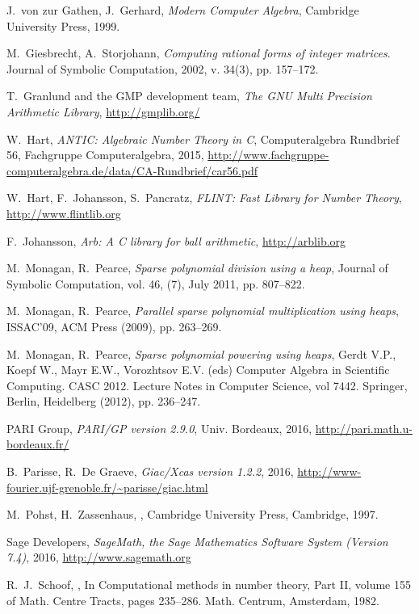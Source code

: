 \documentclass{sig-alternate-05-2015}
\begin{document}
{\begin{thebibliographyy}{99}
J.~von zur Gathen, J.~Gerhard, {\em Modern Computer Algebra}, Cambridge University Press, 1999.

M.~Giesbrecht, A.~Storjohann, {\em Computing rational forms of integer matrices}. Journal of Symbolic
Computation, 2002, v. 34(3), pp. 157--172.

T.~Granlund and the GMP development team, {\em The GNU Multi Precision Arithmetic 
Library}, \url{http://gmplib.org/}

W.~Hart, {\em ANTIC: Algebraic Number Theory in C}, Computeralgebra Rundbrief 56, Fachgruppe Computeralgebra, 2015, \url{http://www.fachgruppe-computeralgebra.de/data/CA-Rundbrief/car56.pdf}

W.~Hart, F.~Johansson, S.~Pancratz, {\em FLINT: Fast Library for Number Theory}, \url{http://www.flintlib.org}

F.~Johansson, {\em Arb: A C library for ball arithmetic}, \url{http://arblib.org}

M.~Monagan, R.~Pearce, {\em Sparse polynomial division using a heap}, Journal of Symbolic Computation, vol. 46, (7), July 2011, pp. 807--822.

M.~Monagan, R.~Pearce, {\em Parallel sparse polynomial multiplication using heaps}, ISSAC'09, ACM Press (2009), pp. 263--269.

M.~Monagan, R.~Pearce, {\em Sparse polynomial powering using heaps}, Gerdt V.P., Koepf W., Mayr E.W., Vorozhtsov E.V. (eds) Computer Algebra in Scientific Computing. CASC 2012. Lecture Notes in Computer Science, vol 7442. Springer, Berlin, Heidelberg (2012), pp. 236--247.

PARI Group, {\em PARI/GP version 2.9.0}, Univ. Bordeaux, 2016, \url{http://pari.math.u-bordeaux.fr/}

B.~Parisse, R.~De Graeve, {\em Giac/Xcas version 1.2.2}, 2016, \url{http://www-fourier.ujf-grenoble.fr/~parisse/giac.html}

M.~Pohst, H.~Zassenhaus,
,
\newblock Cambridge University Press, Cambridge, 1997.

Sage Developers, {\em SageMath, the Sage Mathematics Software System (Version 7.4)}, 2016,  \url{http://www.sagemath.org}

R.~J.~Schoof,
,
\newblock In Computational methods in number theory, {P}art {II}, volume
  155 of Math. Centre Tracts, pages 235--286. Math. Centrum, Amsterdam,
  1982.


\end{thebibliographyy}}
\end{document}
